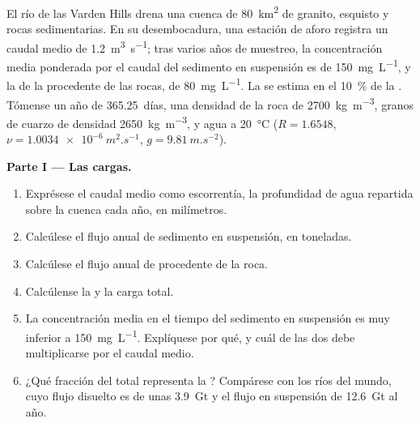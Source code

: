\begin{problem}
\label{pb:b1:erosion-transport:1}
El río de las Varden Hills drena una cuenca de \qty{80}{km^2} de granito, esquisto y rocas sedimentarias. En su desembocadura, una estación de aforo registra un
caudal medio de \qty{1.2}{m^3.s^{-1}}; tras varios años de muestreo, la concentración media ponderada por el caudal del sedimento en suspensión es de \qty{150}{mg.L^{-1}},
y la de la  procedente de las rocas, de \qty{80}{mg.L^{-1}}. La  se estima en el \qty{10}{\percent} de la . Tómense un
año de \num{365.25}~días, una densidad de la roca de \qty{2700}{kg.m^{-3}}, granos de cuarzo de densidad \qty{2650}{kg.m^{-3}}, y agua a \qty{20}{\celsius} ($R
= 1.6548$, $\nu = \qty{1.0034e-6}{m^2.s^{-1}}$, $g = \qty{9.81}{m.s^{-2}}$).

\medskip
\noindent\textbf{Parte I --- Las cargas.}
\begin{enumerate}
  \item Exprésese el caudal medio como escorrentía, la profundidad de agua repartida sobre la cuenca cada año, en milímetros.
  \item Calcúlese el flujo anual de sedimento en suspensión, en toneladas.
  \item Calcúlese el flujo anual de  procedente de la roca.
  \item Calcúlense la  y la carga total.
  \item La concentración media en el tiempo del sedimento en suspensión es muy inferior a \qty{150}{mg.L^{-1}}. Explíquese por qué, y cuál de las dos
        debe multiplicarse por el caudal medio.
  \item ¿Qué fracción del total representa la ? Compárese con los ríos del mundo, cuyo flujo disuelto es de unas \qty{3.9}{Gt} y el flujo en
        suspensión de \qty{12.6}{Gt} al año.
\end{enumerate}


\end{problem}
